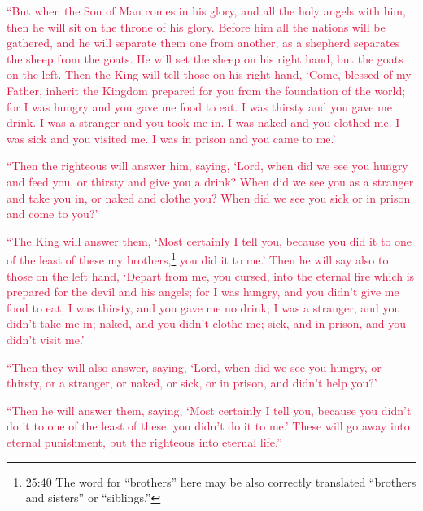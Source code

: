\myverse{}\textcolor{crimson}{“But when the Son of Man comes in his glory, and all the
	holy angels with him, then he will sit on the throne of his glory.
}
\myverse{}\textcolor{crimson}{Before him all the nations will be gathered, and he will separate them
	one from another, as a shepherd separates the sheep from the goats.
}
\myverse{}\textcolor{crimson}{He will set the sheep on his right hand, but the goats on the left.
}
\myverse{}\textcolor{crimson}{Then the King will tell those on his right hand, ‘Come, blessed of my
	Father, inherit the Kingdom prepared for you from the foundation of the world;
}
\myverse{}\textcolor{crimson}{for I was hungry and you gave me food to eat. I was thirsty and you gave
	me drink. I was a stranger and you took me in.
}
\myverse{}\textcolor{crimson}{I was naked and you clothed me. I was sick and you visited me. I was
	in prison and you came to me.’}

\myverse{}\textcolor{crimson}{“Then the righteous will answer him, saying, ‘Lord, when
	did we see you hungry and feed you, or thirsty and give you a drink?
}
\myverse{}\textcolor{crimson}{When did we see you as a stranger and take you in, or naked and clothe
	you?
}
\myverse{}\textcolor{crimson}{When did we see you sick or in prison and come to you?’}

\myverse{}\textcolor{crimson}{“The King will answer them, ‘Most certainly I tell you,
	because you did it to one of the least of these my brothers,}\footnote{25:40 The word for “brothers” here may be also correctly translated “brothers and sisters” or “siblings.”}
\textcolor{crimson}{you did it to me.’
}
\myverse{}\textcolor{crimson}{Then he will say also to those on the left hand, ‘Depart from me, you
	cursed, into the eternal fire which is prepared for the devil and his angels;
}
\myverse{}\textcolor{crimson}{for I was hungry, and you didn’t give me food to eat; I was thirsty,
	and you gave me no drink;
}
\myverse{}\textcolor{crimson}{I was a stranger, and you didn’t take me in; naked, and you didn’t clothe
	me; sick, and in prison, and you didn’t visit me.’}

\myverse{}\textcolor{crimson}{“Then they will also answer, saying, ‘Lord, when did we
	see you hungry, or thirsty, or a stranger, or naked, or sick, or in prison, and didn’t help you?’}

\myverse{}\textcolor{crimson}{“Then he will answer them, saying, ‘Most certainly I tell
	you, because you didn’t do it to one of the least of these, you didn’t do it to me.’
}
\myverse{}\textcolor{crimson}{These will go away into eternal punishment, but the righteous into eternal
	life.”}


